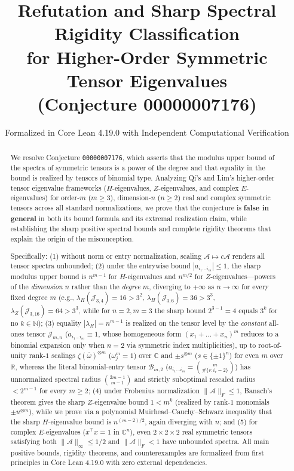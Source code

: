 \documentclass[11pt]{article}
\title{\textbf{Refutation and Sharp Spectral Rigidity Classification\\
for Higher-Order Symmetric Tensor Eigenvalues\\
(Conjecture 00000007176)}}
\author{Formalized in Core Lean 4.19.0 with Independent Computational Verification}
\date{}
\theoremstyle{definition}
\newcommand{\R}{\mathbb{R}}
\newcommand{\C}{\mathbb{C}}
\newcommand{\N}{\mathbb{N}}
\newcommand{\cA}{\mathcal{A}}
\newcommand{\cB}{\mathcal{B}}
\newcommand{\cJ}{\mathcal{J}}
\begin{document}
\maketitle

\begin{abstract}
We resolve Conjecture \texttt{00000007176}, which asserts that the modulus upper bound of
the spectra of symmetric tensors is a power of the degree and that equality in the bound
is realized by tensors of binomial type. Analyzing Qi's and Lim's higher-order tensor
eigenvalue frameworks ($H$-eigenvalues, $Z$-eigenvalues, and complex $E$-eigenvalues) for
order-$m$ ($m \ge 3$), dimension-$n$ ($n \ge 2$) real and complex symmetric tensors across
all standard normalizations, we prove that the conjecture is \textbf{false in general} in
both its bound formula and its extremal realization claim, while establishing the sharp
positive spectral bounds and complete rigidity theorems that explain the origin of the
misconception.

Specifically: (1) without norm or entry normalization, scaling $\cA \mapsto c\cA$ renders
all tensor spectra unbounded; (2) under the entrywise bound $|a_{i_1 \dots i_m}| \le 1$,
the sharp modulus upper bound is $n^{m-1}$ for $H$-eigenvalues and $n^{m/2}$ for
$Z$-eigenvalues---powers of the \emph{dimension} $n$ rather than the \emph{degree} $m$,
diverging to $+\infty$ as $n \to \infty$ for every fixed degree $m$ (e.g., $\lambda_H(\cJ_{3,4}) = 16 > 3^2$,
$\lambda_H(\cJ_{3,6}) = 36 > 3^3$, $\lambda_Z(\cJ_{3,16}) = 64 > 3^3$, while for $n = 2, m = 3$
the sharp bound $2^{3-1} = 4$ equals $3^k$ for no $k \in \N$); (3) equality $|\lambda_H| = n^{m-1}$
is realized on the tensor level by the \emph{constant} all-ones tensor $\cJ_{m,n}$
($a_{i_1 \dots i_m} \equiv 1$, whose homogeneous form $(x_1 + \dots + x_n)^m$ reduces to a
binomial expansion only when $n = 2$ via symmetric index multiplicities), up to root-of-unity
rank-$1$ scalings $\zeta (\overline{\omega})^{\otimes m}$ ($\omega_j^m = 1$) over $\C$ and
$\pm s^{\otimes m}$ ($s \in \{\pm 1\}^n$) for even $m$ over $\R$, whereas the literal
binomial-entry tensor $\cB_{m,2}$ ($a_{i_1 \dots i_m} = \binom{m}{\#\{r : i_r = 2\}}$) has
unnormalized spectral radius $\binom{2m-1}{m-1}$ and strictly suboptimal rescaled radius
$< 2^{m-1}$ for every $m \ge 2$; (4) under Frobenius normalization $\|\cA\|_F \le 1$,
Banach's theorem gives the sharp $Z$-eigenvalue bound $1 < m^k$ (realized by rank-$1$
monomials $\pm u^{\otimes m}$), while we prove via a polynomial Muirhead--Cauchy--Schwarz
inequality that the sharp $H$-eigenvalue bound is $n^{(m-2)/2}$, again diverging with $n$;
and (5) for complex $E$-eigenvalues ($x^\top x = 1$ in $\C^n$), even $2 \times 2 \times 2$
real symmetric tensors satisfying both $\|\cA\|_\infty \le 1/2$ and $\|\cA\|_F < 1$ have
unbounded spectra. All main positive bounds, rigidity theorems, and counterexamples are
formalized from first principles in Core Lean 4.19.0 with zero external dependencies.
\end{abstract}
\end{document}
